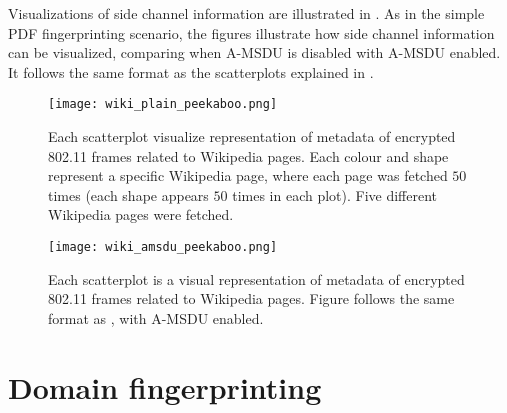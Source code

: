 Visualizations of side channel information are illustrated in . As in the simple PDF fingerprinting scenario, the figures illustrate how side channel information can be visualized, comparing when A-MSDU is disabled with A-MSDU enabled. It follows the same format as the scatterplots explained in .

\begin{figure}
	\centering
        \texttt{[image: wiki\_plain\_peekaboo.png]}
       \caption{Each scatterplot visualize representation of metadata of encrypted 802.11 frames related to Wikipedia pages. Each colour and shape represent a specific Wikipedia page, where each page was fetched $50$ times (each shape appears $50$ times in each plot). Five different Wikipedia pages were fetched.}
        \label{fig:wiki_plain_peekaboo}
\end{figure}


\begin{figure}
	\centering
        \texttt{[image: wiki\_amsdu\_peekaboo.png]}
         \caption{Each scatterplot is a visual representation of metadata of encrypted 802.11 frames related to Wikipedia pages. Figure follows the same format as , with A-MSDU enabled.}
    \label{fig:wiki_amsdu_peekaboo}
\end{figure}

\clearpage

\section{Domain fingerprinting\label{sec:result3-result}}

\begin{table}
    \caption{Classifier's accuracy in the domain fingerprinting scenario.}
    \centering
    \label{fig:accuracy_WFS3}
\end{table}

